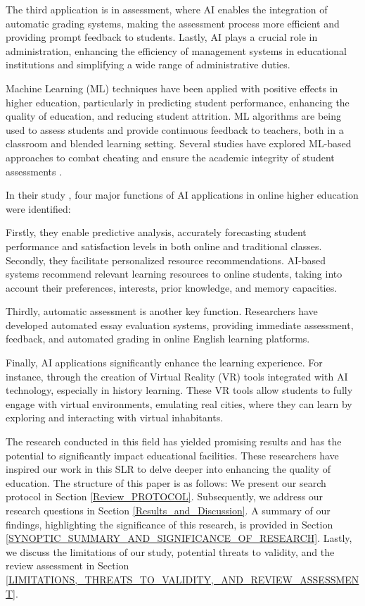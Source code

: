 The third application is in assessment, where AI enables the integration of automatic grading systems, making the assessment process more efficient and providing prompt feedback to students. Lastly, AI plays a crucial role in administration, enhancing the efficiency of management systems in educational institutions and simplifying a wide range of administrative duties.

Machine Learning (ML) techniques have been applied with positive effects in higher education, particularly in predicting student performance, enhancing the quality of education, and reducing student attrition. ML algorithms are being used to assess students and provide continuous feedback to teachers, both in a classroom and blended learning setting. Several studies have explored ML-based approaches to combat cheating and ensure the academic integrity of student assessments \cite{AI_IN_Education_SLR}.

In their study \cite{Artificial_intelligence_in_online_higher_education:_A_systematic_review_of_empirical}, four major functions of AI applications in online higher education were identified:

Firstly, they enable predictive analysis, accurately forecasting student performance and satisfaction levels in both online and traditional classes. Secondly, they facilitate personalized resource recommendations. AI-based systems recommend relevant learning resources to online students, taking into account their preferences, interests, prior knowledge, and memory capacities.

Thirdly, automatic assessment is another key function. Researchers have developed automated essay evaluation systems, providing immediate assessment, feedback, and automated grading in online English learning platforms.

Finally, AI applications significantly enhance the learning experience. For instance, through the creation of Virtual Reality (VR) tools integrated with AI technology, especially in history learning. These VR tools allow students to fully engage with virtual environments, emulating real cities, where they can learn by exploring and interacting with virtual inhabitants.

The research conducted in this field has yielded promising results and has the potential to significantly impact educational facilities. These researchers have inspired our work in this SLR to delve deeper into enhancing the quality of education. The structure of this paper is as follows: We present our search protocol in Section \ref{Review_PROTOCOL}. Subsequently, we address our research questions in Section \ref{Results_and_Discussion}. A summary of our findings, highlighting the significance of this research, is provided in Section \ref{SYNOPTIC_SUMMARY_AND_SIGNIFICANCE_OF_RESEARCH}. Lastly, we discuss the limitations of our study, potential threats to validity, and the review assessment in Section \ref{LIMITATIONS,_THREATS_TO_VALIDITY,_AND_REVIEW_ASSESSMENT}.


